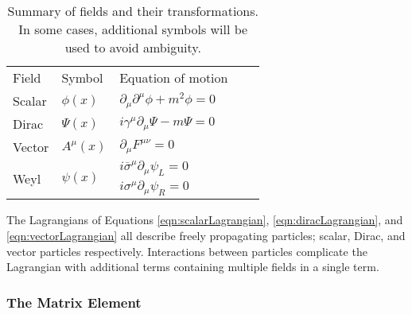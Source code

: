\begin{table}[htp]
\begin{center}
{\footnotesize
\begin{tabular}{l | l l l l}
\toprule
Field & Symbol & Equation of motion  \\
Scalar & $\phi(x)$    & $\partial_\mu\partial^\mu\phi+m^2\phi=0$  \\
Dirac  & $\Psi(x)$    & $i\gamma^\mu\partial_\mu\Psi-m\Psi=0$  \\
Vector & $A^\mu(x)$   & $\partial_\mu F^{\mu\nu}=0$  \\
\multirow{2}{*}{Weyl} & \multirow{2}{*}{$\psi(x)$}   & $i\overline{\sigma}^\mu\partial_\mu\psi_L=0$ \\
                      &                              & $i\sigma^\mu\partial_\mu\psi_R=0$  \\
\midrule
\bottomrule
\end{tabular}
}
\caption{Summary of fields and their transformations. In some cases, additional symbols will be used to avoid ambiguity.}
\label{tab:fields}
\end{center}
\end{table}

The Lagrangians of Equations \ref{eqn:scalarLagrangian}, \ref{eqn:diracLagrangian}, and \ref{eqn:vectorLagrangian} all describe freely propagating particles; scalar, Dirac, and vector particles respectively.
Interactions between particles complicate the Lagrangian with additional terms containing multiple fields in a single term.

\subsubsection{The Matrix Element}\label{sec:me}

